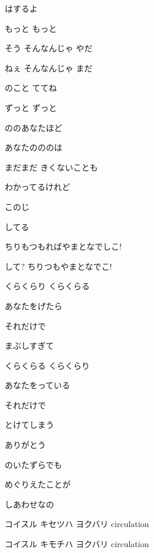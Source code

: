 \documentclass[14pt]{ltjsarticle}
\begin{document}
{  はするよ
  \jisho{}

  もっと もっと
  \jisho{}

\item
  そう そんなんじゃ やだ
  \jisho{}

  ねぇ そんなんじゃ まだ
  \jisho{}

  のこと ててね
  \jisho{}

  ずっと ずっと
  \jisho{}

\item
  ののあなたほど
  \jisho{}

  あなたのののは
  \jisho{}

  まだまだ きくないことも
  \jisho{}

  わかってるけれど
  \jisho{}

\item
  このじ 
  \jisho{}

  してる 
  \jisho{}

  ちりもつもればやまとなでしこ!
  \jisho{}

  して? ちりつもやまとなでこ!
  \jisho{}

\item
  くらくらり くらくらる
  \jisho{}

  あなたをげたら
  \jisho{}

  それだけで
  \jisho{}

  まぶしすぎて
  \jisho{}

\item
  くらくらる くらくらり
  \jisho{}

  あなたをっている
  \jisho{}

  それだけで
  \jisho{}

  とけてしまう
  \jisho{}

\item
   ありがとう
  \jisho{}

  のいたずらでも
  \jisho{}

  めぐりえたことが
  \jisho{}

  しあわせなの
  \jisho{}

\item
  コイスル キセツハ ヨクバリ circulation
  \jisho{}

  コイスル キモチハ ヨクバリ circulation
  \jisho{}

}
\end{document}
